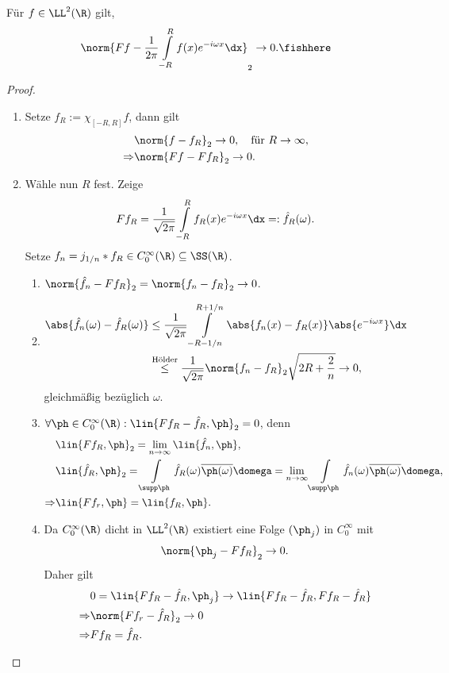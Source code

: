 \begin{prop}
\label{prop:2.26}
Für $f\in\LL^2(\R)$ gilt,
\begin{align*}
\norm{Ff - \frac{1}{2\pi}\int\limits_{-R}^R f(x)e^{-i\omega x}\dx}_2 \to
0.\fishhere
\end{align*}
\end{prop}
\begin{proof}
\begin{enumerate}[label=\arabic{*}.)]
  \item Setze $f_R := \chi_{[-R,R]}f$, dann gilt
\begin{align*}
&\norm{f-f_R}_2 \to 0,\quad\text{für }R\to\infty,\\
\Rightarrow & \norm{Ff-Ff_R}_2 \to 0.
\end{align*}
\item Wähle nun $R$ fest. Zeige 
\begin{align*}
Ff_R = \frac{1}{\sqrt{2\pi}}\int\limits_{-R}^R f_R(x)e^{-i\omega x}\dx =:
\hat{f}_R(\omega).
\end{align*}
Setze $f_n = j_{1/n}*f_R\in C_0^\infty(\R)\subseteq\SS(\R)$.
\begin{enumerate}[label=\alph{*})]
  \item $\norm{\hat{f}_n-Ff_R}_2 = \norm{f_n - f_R}_2 \to 0$.
  \item 
\begin{align*}
\abs{\hat{f}_n(\omega) - \hat{f}_R(\omega)}
&\le \frac{1}{\sqrt{2\pi}}\int\limits_{-R-1/n}^{R+1/n}
\abs{f_n(x)-f_R(x)}\abs{e^{-i\omega x}}\dx\\
&\overset{\small\text{Hölder}}{\le}
\frac{1}{\sqrt{2\pi}}\norm{f_n-f_R}_2\sqrt{2R+\frac{2}{n}} \to 0,
\end{align*}
gleichmäßig bezüglich $\omega$.
\item $\forall \ph\in C_0^\infty(\R) : \lin{Ff_R-\hat{f}_R,\ph}_2 = 0$, denn
\begin{align*}
&\lin{Ff_R,\ph}_2 = \lim\limits_{n\to\infty} \lin{\hat{f}_n,\ph},\\
&\lin{\hat{f}_R,\ph}_2 = 
\int\limits_{\supp \ph} \hat{f}_R(\omega)\overline{\ph(\omega)}\domega =
\lim\limits_{n\to\infty} \int\limits_{\supp\ph}
\hat{f}_n(\omega)\overline{\ph(\omega)}\domega,\\
\Rightarrow & \lin{Ff_r,\ph} = \lin{f_R,\ph}.
\end{align*}
\item Da $C_0^\infty(\R)$ dicht in $\LL^2(\R)$ existiert eine Folge $(\ph_j)$
in $C_0^\infty$ mit
\begin{align*}
\norm{\ph_j - Ff_R}_2 \to 0.
\end{align*}
Daher gilt
\begin{align*}
&0 = \lin{Ff_R-\hat{f}_R,\ph_j} \to 
\lin{Ff_R-\hat{f}_R,Ff_R-\hat{f}_R}\\
\Rightarrow &\norm{Ff_r-\hat{f}_R}_2 \to 0\\
 \Rightarrow& Ff_R = \hat{f}_R.\qedhere
\end{align*}
\end{enumerate}
\end{enumerate}
\end{proof}


